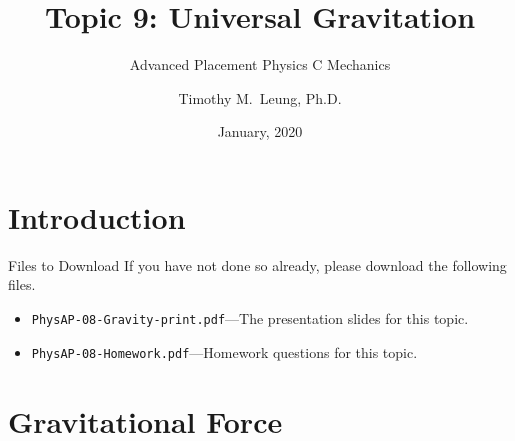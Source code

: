 \documentclass[12pt,compress,aspectratio=169]{beamer}
\title{Topic 9: Universal Gravitation}
\subtitle{Advanced Placement Physics C Mechanics}
\author{Timothy M.\ Leung, Ph.D.}
\institute{Olympiads School\\Toronto, Ontario, Canada}
\date{January, 2020}
\newcommand{\mb}[1]{\ensuremath\mathbf{#1}}
\begin{document}
\begin{frame}
  \maketitle
\end{frame}


\section[Intro]{Introduction}

\begin{frame}{Files to Download}
  If you have not done so already, please download the following files.
  \begin{itemize}
  \item\texttt{PhysAP-08-Gravity-print.pdf}---The presentation slides for this
    topic.
  \item\texttt{PhysAP-08-Homework.pdf}---Homework questions for this topic.
  \end{itemize}
\end{frame}



\section{Gravitational Force}

\end{document}
